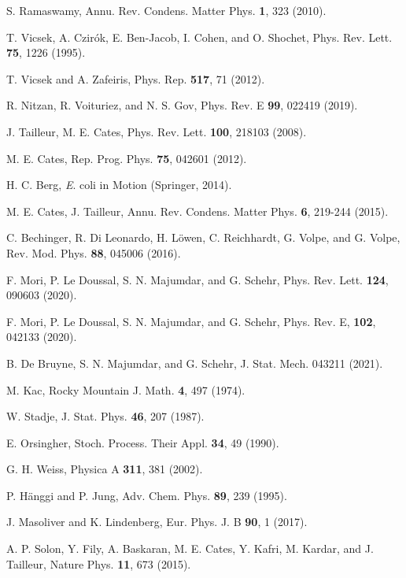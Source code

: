 \documentclass[aps,pre,twocolumn,superscriptaddress,showpacs]{revtex4-1}
\begin{document}
\begin{thebibliography}{10}

 S. Ramaswamy, Annu. Rev. Condens. Matter Phys. {\bf 1}, 323 (2010).

 T. Vicsek, A. Czir\'ok, E. Ben-Jacob, I. Cohen, and O. Shochet, Phys. Rev. Lett. {\bf 75}, 1226 (1995).

 T. Vicsek and A. Zafeiris, Phys. Rep. {\bf 517}, 71 (2012).

 R. Nitzan, R. Voituriez, and N. S. Gov, Phys. Rev. E {\bf 99}, 022419 (2019).

 J. Tailleur, M. E. Cates, Phys. Rev. Lett. {\bf 100}, 218103 (2008).

 M. E. Cates, Rep. Prog. Phys. {\bf 75}, 042601 (2012).

 H. C. Berg, {\emph E. coli in Motion} (Springer, 2014). 

 M. E. Cates, J. Tailleur, Annu. Rev. Condens. Matter Phys. {\bf 6}, 219-244 (2015). 

 C. Bechinger, R. Di Leonardo, H. L\"owen, C. Reichhardt, G. Volpe, and G. Volpe, Rev. Mod. Phys. {\bf 88}, 045006 (2016).

 F. Mori, P. Le Doussal, S. N. Majumdar, and G. Schehr, Phys. Rev. Lett. {\bf 124}, 090603  (2020).

 F. Mori, P. Le Doussal, S. N. Majumdar, and G. Schehr, Phys. Rev. E, {\bf 102}, 042133  (2020).

 B. De Bruyne, S. N. Majumdar, and G. Schehr, J. Stat. Mech. 043211 (2021).

 M. Kac, Rocky Mountain J. Math. {\bf 4}, 497 (1974).

 W. Stadje, J. Stat. Phys. {\bf 46}, 207 (1987).%

 E. Orsingher, Stoch. Process. Their Appl. {\bf 34}, 49 (1990).

 G. H. Weiss, Physica A {\bf 311}, 381 (2002).

 P. H\"anggi and P. Jung, Adv. Chem. Phys. {\bf 89}, 239 (1995).

 J. Masoliver and K. Lindenberg, Eur. Phys. J. B {\bf 90}, 1 (2017).

 A. P. Solon, Y. Fily, A. Baskaran, M. E. Cates, Y. Kafri, M. Kardar, and J. Tailleur, Nature Phys. {\bf 11}, 673 (2015).    


\end{thebibliography}
\end{document}
